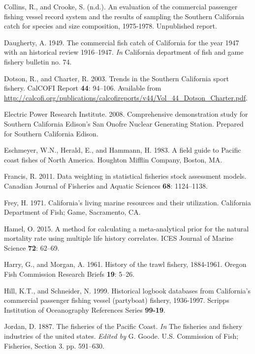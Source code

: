 \documentclass[12pt,]{article}
\begin{document}
\hypertarget{ref-Collins1978}{}
Collins, R., and Crooke, S. (n.d.). An evaluation of the commercial
passenger fishing vessel record system and the results of sampling the
Southern California catch for species and size composition, 1975-1978.
Unpublished report.

\hypertarget{ref-Daugherty1949}{}
Daugherty, A. 1949. The commercial fish catch of California for the year
1947 with an historical review 1916--1947. \emph{In} California
department of fish and game fishery bulletin no. 74.

\hypertarget{ref-Dotson2003}{}
Dotson, R., and Charter, R. 2003. Trends in the Southern California
sport fishery. CalCOFI Report \textbf{44}: 94--106. Available from
\url{http://calcofi.org/publications/calcofireports/v44/Vol_44_Dotson_Charter.pdf}.

\hypertarget{ref-EPRI2008}{}
Electric Power Research Institute. 2008. Comprehensive demonstration
study for Southern California Edison's San Onofre Nuclear Generating
Station. Prepared for Southern California Edison.

\hypertarget{ref-Eschmeyer1983}{}
Eschmeyer, W.N., Herald, E., and Hammann, H. 1983. A field guide to
Pacific coast fishes of North America. Houghton Mifflin Company, Boston,
MA.

\hypertarget{ref-Francis2011}{}
Francis, R. 2011. Data weighting in statistical fisheries stock
assessment models. Canadian Journal of Fisheries and Aquatic Sciences
\textbf{68}: 1124--1138.

\hypertarget{ref-Frey1971}{}
Frey, H. 1971. California's living marine resources and their
utilization. California Department of Fish; Game, Sacramento, CA.

\hypertarget{ref-Hamel2015}{}
Hamel, O. 2015. A method for calculating a meta-analytical prior for the
natural mortality rate using multiple life history correlates. ICES
Journal of Marine Science \textbf{72}: 62--69.

\hypertarget{ref-Harry1961}{}
Harry, G., and Morgan, A. 1961. History of the trawl fishery, 1884-1961.
Oregon Fish Commission Research Briefs \textbf{19}: 5--26.

\hypertarget{ref-Hill1999}{}
Hill, K.T., and Schneider, N. 1999. Historical logbook databases from
California's commercial passenger fishing vessel (partyboat) fishery,
1936-1997. Scripps Institution of Oceanography References Series
\textbf{99-19}.

\hypertarget{ref-Jordan1887}{}
Jordan, D. 1887. The fisheries of the Pacific Coast. \emph{In} The
fisheries and fishery industries of the united states. \emph{Edited by}
G. Goode. U.S. Commission of Fish; Fisheries, Section 3. pp. 591--630.
\end{document}
